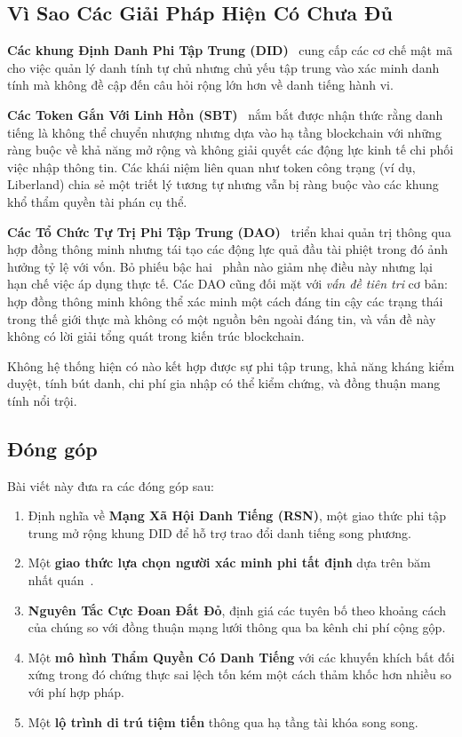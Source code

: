 \documentclass[11pt,a4paper,twocolumn]{article}
\begin{document}
\subsection{Vì Sao Các Giải Pháp Hiện Có Chưa Đủ}

\textbf{Các khung Định Danh Phi Tập Trung (DID)}~\cite{did2022} cung cấp các cơ chế mật mã cho việc quản lý danh tính tự chủ nhưng chủ yếu tập trung vào xác minh danh tính mà không đề cập đến câu hỏi rộng lớn hơn về danh tiếng hành vi.

\textbf{Các Token Gắn Với Linh Hồn (SBT)}~\cite{weyl2022} nắm bắt được nhận thức rằng danh tiếng là không thể chuyển nhượng nhưng dựa vào hạ tầng blockchain với những ràng buộc về khả năng mở rộng và không giải quyết các động lực kinh tế chi phối việc nhập thông tin. Các khái niệm liên quan như token công trạng (ví dụ, Liberland) chia sẻ một triết lý tương tự nhưng vẫn bị ràng buộc vào các khung khổ thẩm quyền tài phán cụ thể.

\textbf{Các Tổ Chức Tự Trị Phi Tập Trung (DAO)}~\cite{buterin2014} triển khai quản trị thông qua hợp đồng thông minh nhưng tái tạo các động lực quả đầu tài phiệt trong đó ảnh hưởng tỷ lệ với vốn. Bỏ phiếu bậc hai~\cite{buterin2019} phần nào giảm nhẹ điều này nhưng lại hạn chế việc áp dụng thực tế. Các DAO cũng đối mặt với \emph{vấn đề tiên tri} cơ bản: hợp đồng thông minh không thể xác minh một cách đáng tin cậy các trạng thái trong thế giới thực mà không có một nguồn bên ngoài đáng tin, và vấn đề này không có lời giải tổng quát trong kiến trúc blockchain.

Không hệ thống hiện có nào kết hợp được sự phi tập trung, khả năng kháng kiểm duyệt, tính bút danh, chi phí gia nhập có thể kiểm chứng, và đồng thuận mang tính nổi trội.

\subsection{Đóng góp}

Bài viết này đưa ra các đóng góp sau:
\begin{enumerate}[nosep]
\item Định nghĩa về \textbf{Mạng Xã Hội Danh Tiếng (RSN)}, một giao thức phi tập trung mở rộng khung DID để hỗ trợ trao đổi danh tiếng song phương.
\item Một \textbf{giao thức lựa chọn người xác minh phi tất định} dựa trên băm nhất quán~\cite{karger1997}.
\item \textbf{Nguyên Tắc Cực Đoan Đắt Đỏ}, định giá các tuyên bố theo khoảng cách của chúng so với đồng thuận mạng lưới thông qua ba kênh chi phí cộng gộp.
\item Một \textbf{mô hình Thẩm Quyền Có Danh Tiếng} với các khuyến khích bất đối xứng trong đó chứng thực sai lệch tốn kém một cách thảm khốc hơn nhiều so với phí hợp pháp.
\item Một \textbf{lộ trình di trú tiệm tiến} thông qua hạ tầng tài khóa song song.
\end{enumerate}
\end{document}
